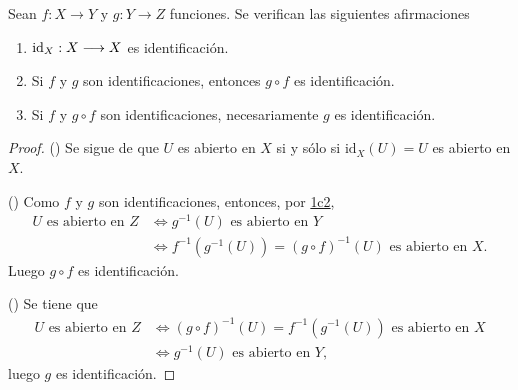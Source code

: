 

\begin{proposition}
Sean $f : X \longrightarrow Y$ y $g : Y \longrightarrow Z$ funciones. Se verifican las siguientes afirmaciones
\begin{enumerate}[label=\textnormal{(\roman*)}]
\item $\textnormal{id}_X : X \longrightarrow X$ es identificación.
\item Si $f$ y $g$ son identificaciones, entonces $g \circ f$ es identificación.
\item Si $f$ y $g \circ f$ son identificaciones, necesariamente $g$ es identificación.
\end{enumerate}
\end{proposition}

\begin{proof}
({\scshape{}}) Se sigue de que $U$ es abierto en $X$ si y sólo si $\text{id}_X(U) = U$ es abierto en $X$.
\bigskip

({\scshape{}}) Como $f$ y $g$ son identificaciones, entonces, por \hyperref[card:1c2]{\textsf{1c2}},
\begin{align*}
    U \text{ es abierto en } Z & \iff g^{-1}(U) \text{ es abierto en } Y \\
                               & \iff f^{-1}(g^{-1}(U)) = (g \circ f)^{-1}(U) \text{ es abierto en } X.
\end{align*}
Luego $g \circ f$ es identificación.
\bigskip

({\scshape{}}) Se tiene que
\begin{align*}
    U \text{ es abierto en } Z & \iff (g \circ f)^{-1}(U) = f^{-1}(g^{-1}(U)) \text{ es abierto en } X \\
                               & \iff g^{-1}(U) \text{ es abierto en } Y,
\end{align*}
luego $g$ es identificación.
\end{proof}
